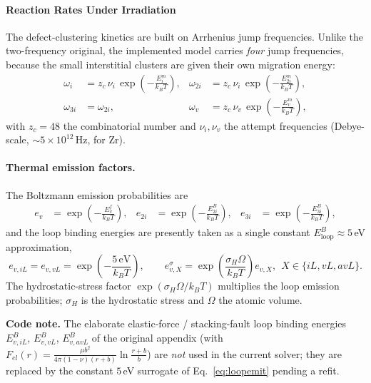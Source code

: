 \documentclass{article}
\begin{document}
\paragraph{Reaction Rates Under Irradiation}

The defect-clustering kinetics are built on Arrhenius jump frequencies. Unlike
the two-frequency original, the implemented model carries \emph{four} jump
frequencies, because the small interstitial clusters are given their own
migration energy:
\begin{align}
\omega_i   &= z_c\,\nu_i\,\exp\!\left(-\frac{E_i^m}{k_BT}\right), &
\omega_{2i}&= z_c\,\nu_i\,\exp\!\left(-\frac{E_{2i}^m}{k_BT}\right), \\
\omega_{3i}&= \omega_{2i}, &
\omega_v   &= z_c\,\nu_v\,\exp\!\left(-\frac{E_v^m}{k_BT}\right),
\label{eq:freqs}
\end{align}
with $z_c=48$ the combinatorial number and $\nu_i,\nu_v$ the attempt frequencies
(Debye-scale, $\sim\!5\times10^{12}\,$Hz, for Zr).

\paragraph{Thermal emission factors.}
The Boltzmann emission probabilities are
\begin{align}
e_v   &= \exp\!\left(-\frac{E_v^f}{k_BT}\right), &
e_{2i}&= \exp\!\left(-\frac{E_{2i}^B}{k_BT}\right), &
e_{3i}&= \exp\!\left(-\frac{E_{3i}^B}{k_BT}\right),
\label{eq:emit}
\end{align}
and the loop binding energies are presently taken as a single constant
$E^B_{\mathrm{loop}}\approx 5\,$eV approximation,
\begin{equation}
e_{v,iL}=e_{v,vL}=\exp\!\left(-\frac{5\,\mathrm{eV}}{k_BT}\right),
\qquad
e^{\sigma}_{v,X}=\exp\!\left(\frac{\sigma_H\Omega}{k_BT}\right)e_{v,X},
\ \ X\in\{iL,vL,avL\}.
\label{eq:loopemit}
\end{equation}
The hydrostatic-stress factor $\exp(\sigma_H\Omega/k_BT)$ multiplies the loop
emission probabilities; $\sigma_H$ is the hydrostatic stress and $\Omega$ the
atomic volume.

\par\medskip\noindent%
\textbf{Code note.} The elaborate elastic-force / stacking-fault loop binding
energies $E^B_{v,iL}$, $E^B_{v,vL}$, $E^B_{v,avL}$ of the original appendix
(with $F_{el}(r)=\tfrac{\mu b^2}{4\pi(1-\nu)(r+b)}\ln\frac{r+b}{b}$) are
\emph{not} used in the current solver; they are replaced by the constant
$5\,$eV surrogate of Eq.~\eqref{eq:loopemit} pending a refit.\par\medskip
\end{document}
